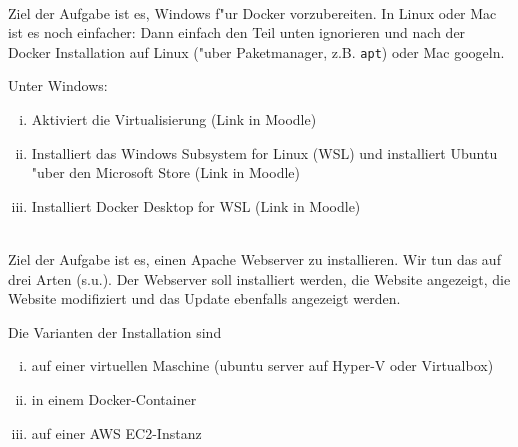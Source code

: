 \newcommand{\printpraesenzlsg}{false}
\newcommand{\printloesungen}{false}
\newcommand{\printbewertungen}{false}
\newcommand{\blattnummer}{1}



\iforiginal{}

	
\\
Ziel der Aufgabe ist es, Windows f"ur Docker vorzubereiten. In Linux oder Mac ist es noch einfacher: Dann einfach den Teil unten ignorieren und nach der Docker Installation auf Linux ("uber Paketmanager, z.B. \texttt{apt}) oder Mac googeln.

Unter Windows:
\begin{enumerate}[(i)]
  \item Aktiviert die Virtualisierung (Link in Moodle)
  \item Installiert das Windows Subsystem for Linux (WSL) und installiert Ubuntu "uber den Microsoft Store (Link in Moodle)
  \item Installiert Docker Desktop for WSL (Link in Moodle)
  
  
\end{enumerate}
 \\
Ziel der Aufgabe ist es, einen Apache Webserver zu installieren.
Wir tun das auf drei Arten (s.u.). Der Webserver soll installiert werden, die Website angezeigt, die Website modifiziert und das Update ebenfalls angezeigt werden.

Die Varianten der Installation sind
\begin{enumerate}[(i)]
  \item auf einer virtuellen Maschine (ubuntu server auf Hyper-V oder Virtualbox)
  \item in einem Docker-Container
  \item auf einer AWS EC2-Instanz
\end{enumerate}

